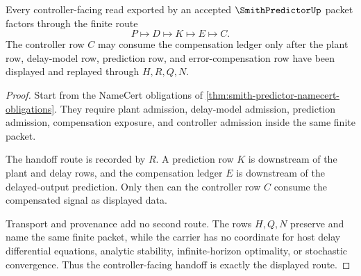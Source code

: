 \begin{theorem}
\label{thm:smith-predictor-delay-compensation-handoff}
Every controller-facing read exported by an accepted $\SmithPredictorUp$ packet factors through the finite route
$$
P \longmapsto D \longmapsto K \longmapsto E \longmapsto C.
$$
The controller row $C$ may consume the compensation ledger only after the plant row, delay-model row, prediction row, and error-compensation row have been displayed and replayed through $H,R,Q,N$.
\end{theorem}
\begin{proof}
Start from the NameCert obligations of \autoref{thm:smith-predictor-namecert-obligations}. They require plant admission, delay-model admission, prediction admission, compensation exposure, and controller admission inside the same finite packet.

The handoff route is recorded by $R$. A prediction row $K$ is downstream of the plant and delay rows, and the compensation ledger $E$ is downstream of the delayed-output prediction. Only then can the controller row $C$ consume the compensated signal as displayed data.

Transport and provenance add no second route. The rows $H,Q,N$ preserve and name the same finite packet, while the carrier has no coordinate for host delay differential equations, analytic stability, infinite-horizon optimality, or stochastic convergence. Thus the controller-facing handoff is exactly the displayed route.
\end{proof}




